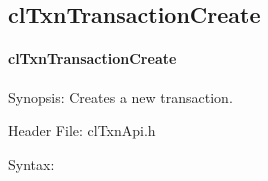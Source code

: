 \begin{flushleft}
\subsection{clTxnTransactionCreate}
\hypertarget{pagetxn103}{}\paragraph{cl\-Txn\-Transaction\-Create}\label{pagetxn103}
\begin{Desc}
\item[Synopsis:]Creates a new transaction.\end{Desc}
\begin{Desc}
\item[Header File:]clTxnApi.h\end{Desc}
\begin{Desc}
\item[Syntax:]


\end{Desc}
\end{flushleft}
